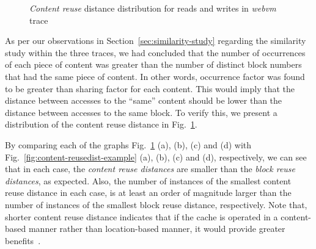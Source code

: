 \begin{figure}[t]
	\caption{\textit{Content reuse} distance distribution for reads and writes in \textit{webvm} trace}
	\label{fig:reusedist-dedup-read-write-distrib}
\end{figure}


As per our observations in Section~\ref{sec:similarity-study} regarding the similarity
study within the three traces, we had concluded that the number of occurrences of
each piece of content was greater than the number of distinct block numbers that
had the same piece of content. In other words, occurrence factor was found to 
be greater than sharing factor for each content. This would imply that the 
distance between accesses to the ``same'' content should be lower than the 
distance between accesses to the same block. To verify this, we present a distribution of 
the content reuse distance in Fig.~\ref{fig:reusedist-dedup-read-write-distrib}.

By comparing each of the graphs Fig.~\ref{fig:reusedist-dedup-read-write-distrib} (a),
(b), (c) and (d) with Fig.~\ref{fig:content-reusedist-example} (a), (b), (c)
and (d), respectively, we can see that in each case, the \textit{content reuse distances}
are smaller than the \textit{block reuse distances}, as expected. Also, the number of
instances of the smallest content reuse distance in each case, is at least an order
of magnitude larger than the number of instances of the smallest block reuse distance,
respectively. Note that, shorter content reuse distance indicates that if the cache
is operated in a content-based manner rather than location-based manner, it would provide
greater benefits~\cite{iodedup}.

